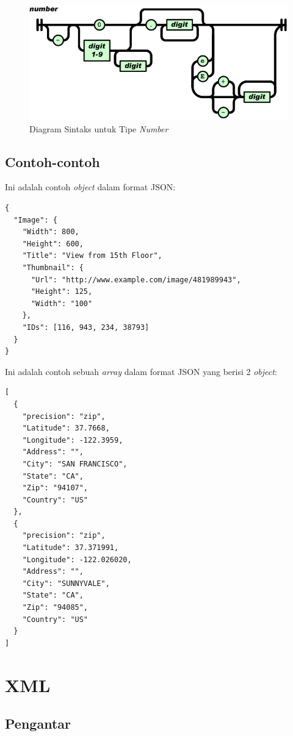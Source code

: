 \documentclass[a4paper, 12pt, oneside]{report}
\begin{document}
\begin{figure}[htp]
\centering
\includegraphics[scale=0.55]{images/number-json.png}
\caption{Diagram Sintaks untuk Tipe \textit{Number} \cite{json-fat-free}}
\label{Diagram Sintaks untuk Tipe Number}
\end{figure}

\newpage
\subsection{Contoh-contoh}
\onehalfspacing Ini adalah contoh \textit{object} dalam format JSON:

\begin{lstlisting}[frame=single]
{
  "Image": {
    "Width": 800,
    "Height": 600,
    "Title": "View from 15th Floor",
    "Thumbnail": {
      "Url": "http://www.example.com/image/481989943",
      "Height": 125,
      "Width": "100"
    },
    "IDs": [116, 943, 234, 38793]
  }
}
\end{lstlisting}

\onehalfspacing Ini adalah contoh sebuah \textit{array} dalam format JSON yang berisi 2 \textit{object}:

\begin{lstlisting}[frame=single]
[
  {
    "precision": "zip",
    "Latitude": 37.7668,
    "Longitude": -122.3959,
    "Address": "",
    "City": "SAN FRANCISCO",
    "State": "CA",
    "Zip": "94107",
    "Country": "US"
  },
  {
    "precision": "zip",
    "Latitude": 37.371991,
    "Longitude": -122.026020,
    "Address": "",
    "City": "SUNNYVALE",
    "State": "CA",
    "Zip": "94085",
    "Country": "US"
  }
]
\end{lstlisting}

\section{XML}

\subsection{Pengantar}
\end{document}
